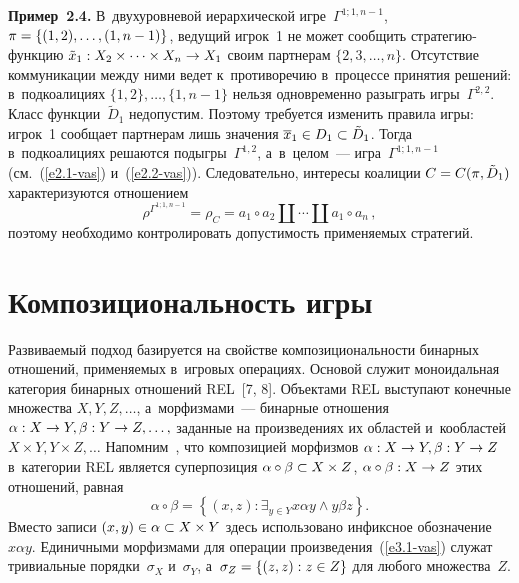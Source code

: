 \begin{multicols}{2}
    \textbf{Пример~2.4.} В~двухуровневой иерархической игре~$\Gamma^{1;1,n-
1}$, $\pi \hm= \{ (1,2), \ldots , (1, n-1)\}$, ведущий игрок~1 не может сообщить  
стра\-те\-гию-функ\-цию  $\tilde{x}_1: X_2\times \cdots \times X_n\hm\to X_1$ своим 
партнерам $\{2,3,\ldots , n\}$. Отсутствие коммуникации меж\-ду ними ведет 
к~противоречию в~процессе принятия решений: в~подкоалициях $\{1,2\}, \ldots , \{1, 
n-1\}$ нельзя одновременно разыг\-рать игры~$\Gamma^{2,2}$. Класс 
функции~$\tilde{D}_1$ недопустим. Поэтому требуется изменить правила игры: 
игрок~1 сообщает парт\-не\-рам лишь значения $\overline{x}_1\hm\in D_1 \hm\subset 
\tilde{D}_1$. Тогда в~подкоалициях решаются подыг\-ры~$\Gamma^{1,2}$, 
а~в~целом~--- игра~$\Gamma^{1;1,n-1}$ (см.~(\ref{e2.1-vas}) и~(\ref{e2.2-vas})). 
Следовательно, интересы коалиции $C\hm= C(\pi, \tilde{D}_1)$ характеризуются 
отношением 
    \begin{equation}
    \rho^{\Gamma^{1;1,n-1}} =\rho_C= a_1\circ a_2\coprod \cdots \coprod a_1\circ 
a_n\,,
    \label{e2.5-vas}
    \end{equation}
    поэтому необходимо контролировать до\-пус\-ти\-мость применяемых стратегий. 
    
\section{Композициональность игры}

    Развиваемый подход базируется на свойстве ком\-по\-зи\-ци\-о\-наль\-ности бинарных 
отношений, при\-ме\-ня\-емых в~игровых операциях. Основой служит моноидальная 
категория бинарных отношений REL~[7, 8]. Объектами REL вы\-сту\-па\-ют 
конечные множества $X, Y, Z, \ldots$, а~морфизмами~--- бинарные отношения $\alpha: 
X\hm\to Y, \beta: Y\hm\to Z, \ldots ,$ заданные на произведениях их областей 
и~кообластей $X\times Y, Y\times Z, \ldots$ Напомним~\cite{8-vas}, что 
композицией морфизмов $\alpha: X\hm\to Y, \beta: Y\hm\to Z$ в~категории REL 
является суперпозиция $\alpha\circ \beta \hm\subset X\times Z$, $\alpha\circ\beta: 
X\hm\to Z$ этих отношений, \mbox{равная}
    \begin{equation}
    \alpha\circ\beta =\left\{ (x,z): \exists_{y\in Y} x\alpha y\wedge y\beta z\right\}.
    \label{e3.1-vas}
    \end{equation}
Вместо записи $(x,y)\hm\in \alpha\hm\subset X\times Y$ здесь использовано 
инфиксное обозначение $x\alpha y$. Единичными морфизмами для операции 
произведения~(\ref{e3.1-vas}) служат тривиальные порядки~$\sigma_X$ 
и~$\sigma_Y$, а~$\sigma_Z\hm= \{ (z,z): z\hm\in Z\}$ для любого мно\-же\-ст\-ва~$Z$. 


\end{multicols}
